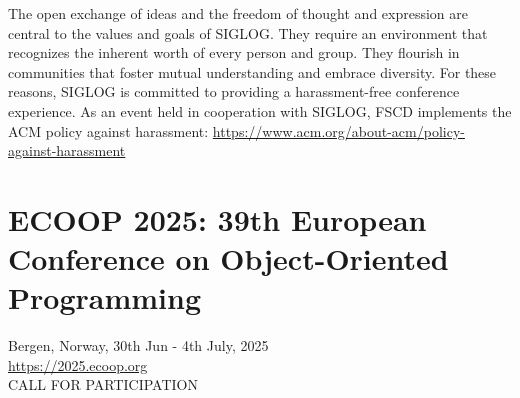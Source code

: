 \documentclass[prodmode,acmtecs]{acmsmall} %
\begin{document}
\begin{itemize}
  The open exchange of ideas and the freedom of thought and expression are central to the values and goals of SIGLOG. They require an environment that recognizes the inherent worth of every person and group. They flourish in communities that foster mutual understanding and embrace diversity. For these reasons, SIGLOG is committed to providing a harassment-free conference experience. As an event held in cooperation with SIGLOG, FSCD implements the ACM policy against harassment: \href{https://www.acm.org/about-acm/policy-against-harassment}{https://www.acm.org/about-acm/policy-against-harassment}  
 
\end{itemize}\section{ECOOP 2025: 39th European Conference on Object-Oriented Programming  }\label{ECOOP2025}  Bergen, Norway,  30th Jun - 4th July, 2025\\ 
  \href{https://2025.ecoop.org}{https://2025.ecoop.org}\\ 
CALL FOR PARTICIPATION 
\end{document}
